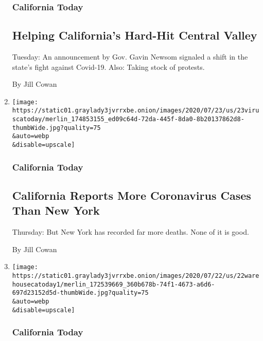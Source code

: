 \begin{enumerate}
  \hypertarget{california-today-3}{%
  \subsubsection{California Today}\label{california-today-3}}

  \hypertarget{helping-californias-hard-hit-central-valley}{%
  \subsection{Helping California's Hard-Hit Central
  Valley}\label{helping-californias-hard-hit-central-valley}}

  Tuesday: An announcement by Gov. Gavin Newsom signaled a shift in the
  state's fight against Covid-19. Also: Taking stock of protests.

  By Jill Cowan
\item
  \href{/2020/07/23/us/california-coronavirus-new-york-cases.html}{}

  \texttt{[image: https://static01.graylady3jvrrxbe.onion/images/2020/07/23/us/23viruscatoday/merlin\_174853155\_ed09c64d-72da-445f-8da0-8b20137862d8-thumbWide.jpg?quality=75\\\&auto=webp\\\&disable=upscale]}

  \hypertarget{california-today-4}{%
  \subsubsection{California Today}\label{california-today-4}}

  \hypertarget{california-reports-more-coronavirus-cases-than-new-york}{%
  \subsection{California Reports More Coronavirus Cases Than New
  York}\label{california-reports-more-coronavirus-cases-than-new-york}}

  Thursday: But New York has recorded far more deaths. None of it is
  good.

  By Jill Cowan
\item
  \href{/2020/07/22/us/coronavirus-ca-warehouse-workers.html}{}

  \texttt{[image: https://static01.graylady3jvrrxbe.onion/images/2020/07/22/us/22warehousecatoday1/merlin\_172539669\_360b678b-74f1-4673-a6d6-697d23152d5d-thumbWide.jpg?quality=75\\\&auto=webp\\\&disable=upscale]}

  \hypertarget{california-today-5}{%
  \subsubsection{California Today}\label{california-today-5}}


\end{enumerate}
